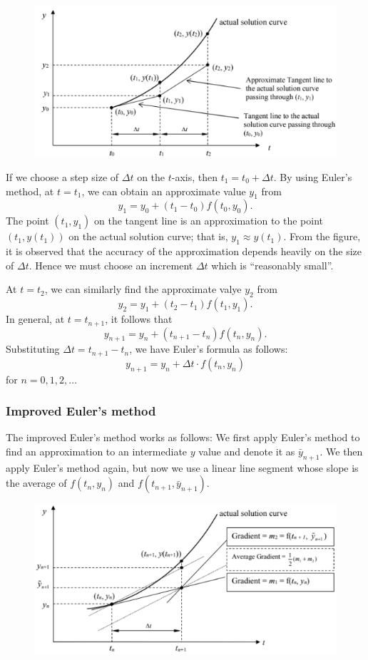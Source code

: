 \begin{figure}[H]
    \centering
    \includegraphics[width=0.8\linewidth]{images/euler-method-de.png}
\end{figure}

If we choose a step size of $\Delta t$ on the $t$-axis, then $t_1=t_0+\Delta t$. By using Euler's method, at $t=t_1$, we can obtain an approximate value $y_1$ from
\[ y_1=y_0+(t_1-t_0)f(t_0,y_0). \]
The point $(t_1,y_1)$ on the tangent line is an approximation to the point $(t_1,y(t_1))$ on the actual solution curve; that is, $y_1\approx y(t_1)$. From the figure, it is observed that the accuracy of the approximation depends heavily on the size of $\Delta t$. Hence we must choose an increment $\Delta t$ which is ``reasonably small''.

At $t=t_2$, we can similarly find the approximate valye $y_2$ from
\[ y_2=y_1+(t_2-t_1)f(t_1,y_1). \]
In general, at $t=t_{n+1}$, it follows that
\[ y_{n+1}=y_n+(t_{n+1}-t_n)f(t_n,y_n). \]
Substituting $\Delta t=t_{n+1}-t_n$, we have Euler's formula as follows:
\begin{equation}
y_{n+1}=y_n+\Delta t\cdot f(t_n,y_n)
\end{equation}
for $n=0,1,2,\dots$

\subsubsection{Improved Euler's method}
The improved Euler's method works as follows: We first apply Euler's method to find an approximation to an intermediate $y$ value and denote it as $\bar{y}_{n+1}$. We then apply Euler's method again, but now we use a linear line segment whose slope is the average of $f(t_n,y_n)$ and $f(t_{n+1},\bar{y}_{n+1})$.

\begin{figure}[H]
    \centering
    \includegraphics[width=0.8\linewidth]{images/euler-method-de-improved.png}
\end{figure}

